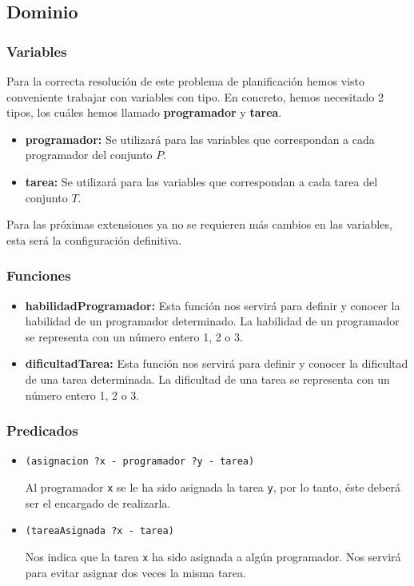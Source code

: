 \documentclass[11pt]{article}
\begin{document}
\subsection{Dominio}
\subsubsection{Variables}
Para la correcta resolución de este problema de planificación hemos visto conveniente trabajar con variables con tipo.
En concreto, hemos necesitado 2 tipos, los cuáles hemos llamado \textbf{programador} y \textbf{tarea}.

\begin{itemize}
  \item \textbf{programador:} Se utilizará para las variables que correspondan a cada programador del conjunto $P$.
  \item \textbf{tarea:} Se utilizará para las variables que correspondan a cada tarea del conjunto $T$.
\end{itemize}

Para las próximas extensiones ya no se requieren más cambios en las variables, esta será la configuración definitiva.

\subsubsection{Funciones}
\begin{itemize}
  \item \textbf{habilidadProgramador:} Esta función nos servirá para definir y conocer la habilidad de un programador determinado. La habilidad de un programador se representa con un número entero 1, 2 o 3.
  \item \textbf{dificultadTarea:} Esta función nos servirá para definir y conocer la dificultad de una tarea determinada. La dificultad de una tarea se representa con un número entero 1, 2 o 3.
\end{itemize}
\subsubsection{Predicados} \label{basic_predicado}
\begin{itemize}
  \item \verb|(asignacion ?x - programador ?y - tarea)|
  
  Al programador \texttt{x} se le ha sido asignada la tarea \texttt{y}, por lo tanto, éste deberá ser el encargado de realizarla.
  
  \item \verb|(tareaAsignada ?x - tarea)|
  
  Nos indica que la tarea \texttt{x} ha sido asignada a algún programador. Nos servirá para evitar asignar dos veces la misma tarea.
\end{itemize}
\end{document}
